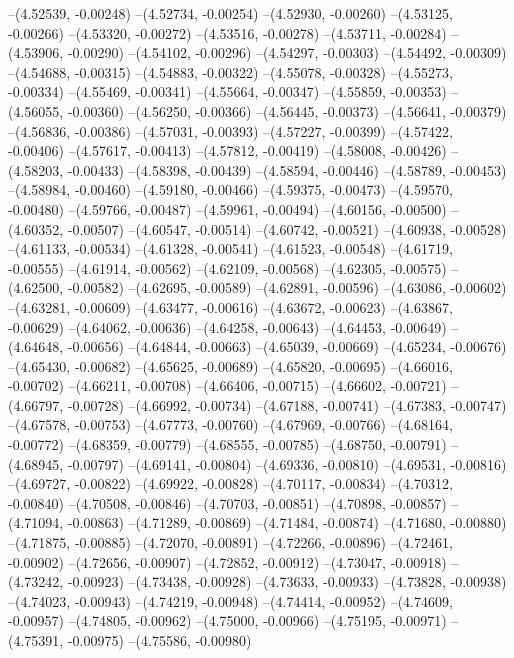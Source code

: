 --(4.52539, -0.00248)
--(4.52734, -0.00254)
--(4.52930, -0.00260)
--(4.53125, -0.00266)
--(4.53320, -0.00272)
--(4.53516, -0.00278)
--(4.53711, -0.00284)
--(4.53906, -0.00290)
--(4.54102, -0.00296)
--(4.54297, -0.00303)
--(4.54492, -0.00309)
--(4.54688, -0.00315)
--(4.54883, -0.00322)
--(4.55078, -0.00328)
--(4.55273, -0.00334)
--(4.55469, -0.00341)
--(4.55664, -0.00347)
--(4.55859, -0.00353)
--(4.56055, -0.00360)
--(4.56250, -0.00366)
--(4.56445, -0.00373)
--(4.56641, -0.00379)
--(4.56836, -0.00386)
--(4.57031, -0.00393)
--(4.57227, -0.00399)
--(4.57422, -0.00406)
--(4.57617, -0.00413)
--(4.57812, -0.00419)
--(4.58008, -0.00426)
--(4.58203, -0.00433)
--(4.58398, -0.00439)
--(4.58594, -0.00446)
--(4.58789, -0.00453)
--(4.58984, -0.00460)
--(4.59180, -0.00466)
--(4.59375, -0.00473)
--(4.59570, -0.00480)
--(4.59766, -0.00487)
--(4.59961, -0.00494)
--(4.60156, -0.00500)
--(4.60352, -0.00507)
--(4.60547, -0.00514)
--(4.60742, -0.00521)
--(4.60938, -0.00528)
--(4.61133, -0.00534)
--(4.61328, -0.00541)
--(4.61523, -0.00548)
--(4.61719, -0.00555)
--(4.61914, -0.00562)
--(4.62109, -0.00568)
--(4.62305, -0.00575)
--(4.62500, -0.00582)
--(4.62695, -0.00589)
--(4.62891, -0.00596)
--(4.63086, -0.00602)
--(4.63281, -0.00609)
--(4.63477, -0.00616)
--(4.63672, -0.00623)
--(4.63867, -0.00629)
--(4.64062, -0.00636)
--(4.64258, -0.00643)
--(4.64453, -0.00649)
--(4.64648, -0.00656)
--(4.64844, -0.00663)
--(4.65039, -0.00669)
--(4.65234, -0.00676)
--(4.65430, -0.00682)
--(4.65625, -0.00689)
--(4.65820, -0.00695)
--(4.66016, -0.00702)
--(4.66211, -0.00708)
--(4.66406, -0.00715)
--(4.66602, -0.00721)
--(4.66797, -0.00728)
--(4.66992, -0.00734)
--(4.67188, -0.00741)
--(4.67383, -0.00747)
--(4.67578, -0.00753)
--(4.67773, -0.00760)
--(4.67969, -0.00766)
--(4.68164, -0.00772)
--(4.68359, -0.00779)
--(4.68555, -0.00785)
--(4.68750, -0.00791)
--(4.68945, -0.00797)
--(4.69141, -0.00804)
--(4.69336, -0.00810)
--(4.69531, -0.00816)
--(4.69727, -0.00822)
--(4.69922, -0.00828)
--(4.70117, -0.00834)
--(4.70312, -0.00840)
--(4.70508, -0.00846)
--(4.70703, -0.00851)
--(4.70898, -0.00857)
--(4.71094, -0.00863)
--(4.71289, -0.00869)
--(4.71484, -0.00874)
--(4.71680, -0.00880)
--(4.71875, -0.00885)
--(4.72070, -0.00891)
--(4.72266, -0.00896)
--(4.72461, -0.00902)
--(4.72656, -0.00907)
--(4.72852, -0.00912)
--(4.73047, -0.00918)
--(4.73242, -0.00923)
--(4.73438, -0.00928)
--(4.73633, -0.00933)
--(4.73828, -0.00938)
--(4.74023, -0.00943)
--(4.74219, -0.00948)
--(4.74414, -0.00952)
--(4.74609, -0.00957)
--(4.74805, -0.00962)
--(4.75000, -0.00966)
--(4.75195, -0.00971)
--(4.75391, -0.00975)
--(4.75586, -0.00980)
